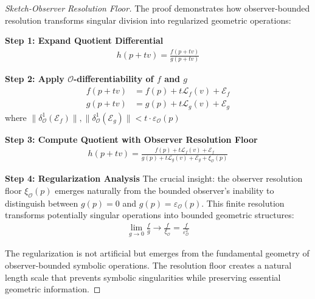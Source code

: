 \begin{proof}[Sketch-Observer Resolution Floor]
\label{proof:bk4_sketch_observer_resolution_floor}
The proof demonstrates how observer-bounded resolution transforms singular division into regularized geometric operations:

\textbf{Step 1: Expand Quotient Differential}
\begin{align}
h(p + tv) = \frac{f(p + tv)}{g(p + tv)}
\end{align}

\textbf{Step 2: Apply $\mathcal{O}$-differentiability of $f$ and $g$}
\begin{align}
f(p + tv) &= f(p) + t\mathcal{L}_f(v) + \mathcal{E}_f \\
g(p + tv) &= g(p) + t\mathcal{L}_g(v) + \mathcal{E}_g
\end{align}
where $\|\delta^1_{\mathcal{O}}(\mathcal{E}_f)\|, \|\delta^1_{\mathcal{O}}(\mathcal{E}_g)\| < t \cdot \varepsilon_{\mathcal{O}}(p)$

\textbf{Step 3: Compute Quotient with Observer Resolution Floor}
\begin{align}
h(p + tv) = \frac{f(p) + t\mathcal{L}_f(v) + \mathcal{E}_f}{g(p) + t\mathcal{L}_g(v) + \mathcal{E}_g + \xi_{\mathcal{O}}(p)}
\end{align}

\textbf{Step 4: Regularization Analysis}
The crucial insight: the observer resolution floor $\xi_{\mathcal{O}}(p)$ emerges naturally from the bounded observer's inability to distinguish between $g(p) = 0$ and $g(p) = \varepsilon_{\mathcal{O}}(p)$. This finite resolution transforms potentially singular operations into bounded geometric structures:
\begin{align}
\lim_{g \to 0} \frac{f}{g} \rightarrow \frac{f}{\xi_{\mathcal{O}}} = \frac{f}{\varepsilon_{\mathcal{O}}^2}
\end{align}

The regularization is not artificial but emerges from the fundamental geometry of observer-bounded symbolic operations. The resolution floor creates a natural length scale that prevents symbolic singularities while preserving essential geometric information.
\end{proof}

